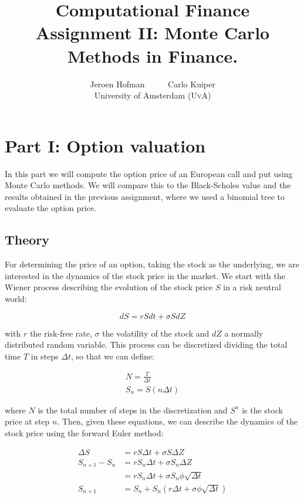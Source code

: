 \documentclass[11pt,a4paper]{article}
\author{Jeroen Hofman \ \ \ \ \ Carlo Kuiper\\
[15pt] University of Amsterdam (\textsc{UvA})}
\title{Computational Finance\\
  Assignment II: Monte Carlo Methods in Finance.}
\begin{document}
\maketitle
\captionsetup{width=0.8\textwidth}
\graphicspath{{Data/}}
\thispagestyle{empty}

\newpage
\tableofcontents
\newpage

\section{Part I: Option valuation}
In this part we will compute the option price of an European call and put using Monte Carlo methods. We will compare this to the Black-Scholes value and the results obtained in the previous assignment, where we used a binomial tree to evaluate the option price.

\subsection{Theory}
For determining the price of an option, taking the stock as the underlying, we are interested in the dynamics of the stock price in the market. We start with the Wiener process describing the evolution of the stock price $S$ in a risk neutral world:

\begin{equation}
  \label{eq:ds}
  dS = rSdt + \sigma SdZ
\end{equation}

with $r$ the risk-free rate, $\sigma$ the volatility of the stock and $dZ$ a normally distributed random variable. This process can be discretized dividing the total time $T$ in steps $\Delta t$, so that we can define:

\begin{align}
  N = \frac{T}{\Delta t} \nonumber \\
  S_n = S(n\Delta t)
\end{align}

where $N$ is the total number of steps in the discretization and $S^n$ is the stock price at step $n$. Then, given these equations, we can describe the dynamics of the stock price using the forward Euler method:

\begin{align}
  \label{eq:euler}
  \Delta S &= rS\Delta t + \sigma S\Delta Z \nonumber \\
  S_{n+1} - S_n &= rS_n\Delta t + \sigma S_n\Delta Z \nonumber \\
  &= rS_n\Delta t + \sigma S_n\phi \sqrt{\Delta t} \nonumber \\
  S_{n+1} &= S_n + S_n(r\Delta t + \sigma \phi \sqrt{\Delta t})
\end{align}
\end{document}
